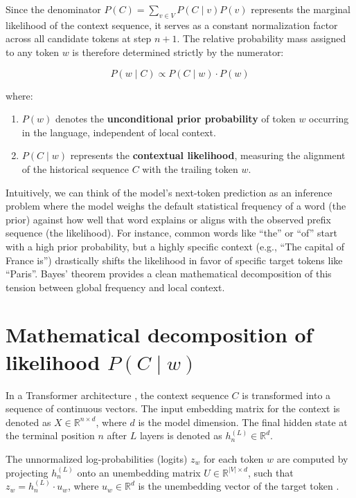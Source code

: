 \documentclass[11pt,a4paper]{article}
\begin{document}
	Since the denominator $P(C) = \sum_{v \in V} P(C \mid v)P(v)$ represents the marginal likelihood of the context sequence, it serves as a constant normalization factor across all candidate tokens at step $n+1$. The relative probability mass assigned to any token $w$ is therefore determined strictly by the numerator:
	
	\begin{equation}
		P(w \mid C) \propto P(C \mid w) \cdot P(w)
	\end{equation}
	
	where:
	\begin{enumerate}
		\item $P(w)$ denotes the \textbf{unconditional prior probability} of token $w$ occurring in the language, independent of local context.
		\item $P(C \mid w)$ represents the \textbf{contextual likelihood}, measuring the alignment of the historical sequence $C$ with the trailing token $w$.
	\end{enumerate}

	Intuitively, we can think of the model's next-token prediction as an inference problem where the model weighs the default statistical frequency of a word (the prior) against how well that word explains or aligns with the observed prefix sequence (the likelihood). For instance, common words like ``the'' or ``of'' start with a high prior probability, but a highly specific context (e.g., ``The capital of France is'') drastically shifts the likelihood in favor of specific target tokens like ``Paris''. Bayes' theorem provides a clean mathematical decomposition of this tension between global frequency and local context.
	
	\section{Mathematical decomposition of likelihood \texorpdfstring{$P(C \mid w)$}{P(C | w)}}
	
	In a Transformer architecture \citep{vaswani2017attention}, the context sequence $C$ is transformed into a sequence of continuous vectors. The input embedding matrix for the context is denoted as $X \in \mathbb{R}^{n \times d}$, where $d$ is the model dimension. The final hidden state at the terminal position $n$ after $L$ layers is denoted as $h_n^{(L)} \in \mathbb{R}^d$. 
	
	The unnormalized log-probabilities (logits) $z_w$ for each token $w$ are computed by projecting $h_n^{(L)}$ onto an unembedding matrix $U \in \mathbb{R}^{|V| \times d}$, such that $z_w = h_n^{(L)} \cdot u_w$, where $u_w \in \mathbb{R}^d$ is the unembedding vector of the target token \citep{press2017using}. 
	
\end{document}
